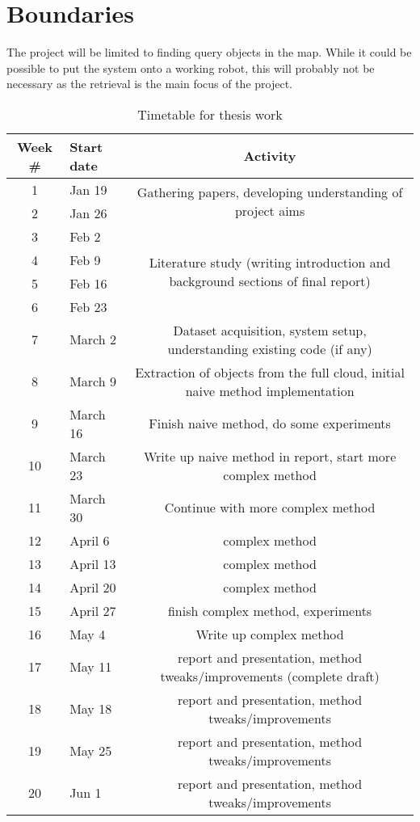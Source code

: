 \documentclass[10pt,a4paper]{article}
\begin{document}
\section{Boundaries}
The project will be limited to finding query objects in the map. While it could
be possible to put the system onto a working robot, this will probably not be
necessary as the retrieval is the main focus of the project. 
\begin{table}
  \centering
  \begin{tabular}{c|l|c}
    Week \# & Start date &  Activity \\\hline
    1 & Jan 19 &\multirow{2}{*}{Gathering papers, developing understanding of
      project aims}\\
    2 & Jan 26 &\\\hline
    3 & Feb 2 &\multirow{4}{*}{Literature study (writing introduction and
      background sections of final report)}\\
    4 & Feb 9 &\\
    5 & Feb 16 &\\
    6 & Feb 23 &\\\hline
    7 & March 2 & Dataset acquisition, system setup, understanding existing code
    (if any)\\
    8 & March 9 & Extraction of objects from the full cloud, initial naive
    method implementation\\
    9 & March 16 & Finish naive method, do some experiments\\
    10 & March 23 & Write up naive method in report, start more complex method\\
    11 & March 30 & Continue with more complex method\\\hline
    12 & April 6 & complex method \\
    13 & April 13 & complex method \\
    14 & April 20 & complex method \\
    15 & April 27 & finish complex method, experiments \\
    16 & May 4 & Write up complex method\\\hline
    17 & May 11 & report and presentation, method tweaks/improvements (complete draft)\\
    18 & May 18 & report and presentation, method tweaks/improvements\\
    19 & May 25 & report and presentation, method tweaks/improvements\\
    20 & Jun 1 & report and presentation, method tweaks/improvements\\
  \end{tabular}
  \caption{Timetable for thesis work}
  \label{tab:time}
\end{table}
\printbibliography
\end{document}
